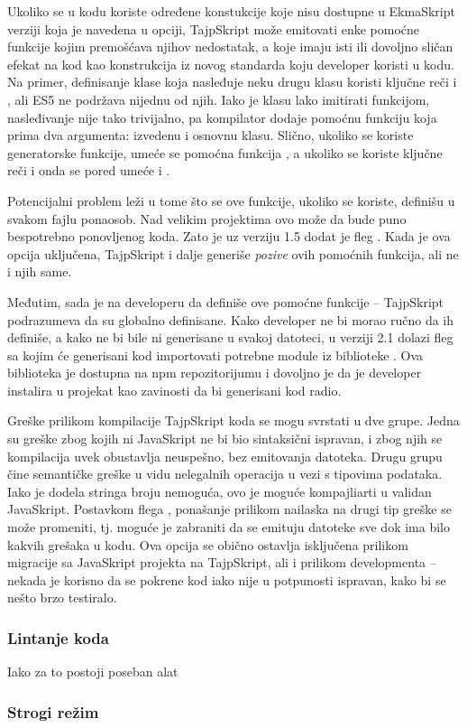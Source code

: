 Ukoliko se u kodu koriste određene konstukcije koje nisu dostupne u EkmaSkript verziji koja je navedena u  opciji, TajpSkript može emitovati enke pomoćne funkcije kojim premošćava njihov nedostatak, a koje imaju isti ili dovoljno sličan efekat na kod kao konstrukcija iz novog standarda koju developer koristi u kodu.
Na primer, definisanje klase koja nasleđuje neku drugu klasu koristi ključne reči  i , ali ES5 ne podržava nijednu od njih.
Iako je klasu lako imitirati funkcijom, nasleđivanje nije tako trivijalno, pa kompilator dodaje pomoćnu funkciju  koja prima dva argumenta: izvedenu i osnovnu klasu.
Slično, ukoliko se koriste generatorske funkcije, umeće se pomoćna funkcija , a ukoliko se koriste ključne reči  i  onda se pored  umeće i .

Potencijalni problem leži u tome što se ove funkcije, ukoliko se koriste, definišu u svakom fajlu ponaosob.
Nad velikim projektima ovo može da bude puno bespotrebno ponovljenog koda.
Zato je uz verziju 1.5 dodat je fleg .
Kada je ova opcija uključena, TajpSkript i dalje generiše \textit{pozive} ovih pomoćnih funkcija, ali ne i njih same.

Međutim, sada je na developeru da definiše ove pomoćne funkcije -- TajpSkript podrazumeva da su globalno definisane.
Kako developer ne bi morao ručno da ih definiše, a kako ne bi bile ni generisane u svakoj datoteci, u verziji 2.1 dolazi fleg  sa kojim će generisani kod importovati potrebne module iz biblioteke .
Ova biblioteka je dostupna na npm repozitorijumu i dovoljno je da je developer instalira u projekat kao zavinosti da bi generisani kod radio.

Greške prilikom kompilacije TajpSkript koda se mogu svrstati u dve grupe.
Jedna su greške zbog kojih ni JavaSkript ne bi bio sintaksični ispravan, i zbog njih se kompilacija uvek obustavlja neuspešno, bez emitovanja datoteka.
Drugu grupu čine semantičke greške u vidu nelegalnih operacija u vezi s tipovima podataka.
Iako je dodela stringa broju nemoguća, ovo je moguće kompajliarti u validan JavaSkript.
Postavkom flega , ponašanje prilikom nailaska na drugi tip greške se može promeniti, tj. moguće je zabraniti da se emituju  datoteke sve dok ima bilo kakvih grešaka u  kodu.
Ova opcija se obično ostavlja isključena prilikom migracije sa JavaSkript projekta na TajpSkript, ali i prilikom developmenta -- nekada je korisno da se pokrene kod iako nije u potpunosti ispravan, kako bi se nešto brzo testiralo.

\subsubsection{Lintanje koda}

Iako za to postoji poseban alat

\subsubsection{Strogi režim}

